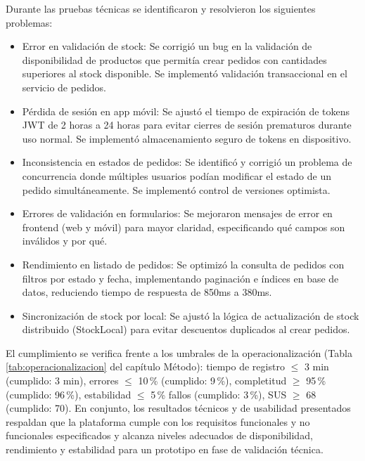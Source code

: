 Durante las pruebas técnicas se identificaron y resolvieron los siguientes problemas:
\begin{itemize}
  \item Error en validación de stock: Se corrigió un bug en la validación de disponibilidad de productos que permitía crear pedidos con cantidades superiores al stock disponible. Se implementó validación transaccional en el servicio de pedidos.
  \item Pérdida de sesión en app móvil: Se ajustó el tiempo de expiración de tokens JWT de 2 horas a 24 horas para evitar cierres de sesión prematuros durante uso normal. Se implementó almacenamiento seguro de tokens en dispositivo.
  \item Inconsistencia en estados de pedidos: Se identificó y corrigió un problema de concurrencia donde múltiples usuarios podían modificar el estado de un pedido simultáneamente. Se implementó control de versiones optimista.
  \item Errores de validación en formularios: Se mejoraron mensajes de error en frontend (web y móvil) para mayor claridad, especificando qué campos son inválidos y por qué.
  \item Rendimiento en listado de pedidos: Se optimizó la consulta de pedidos con filtros por estado y fecha, implementando paginación e índices en base de datos, reduciendo tiempo de respuesta de 850ms a 380ms.
  \item Sincronización de stock por local: Se ajustó la lógica de actualización de stock distribuido (StockLocal) para evitar descuentos duplicados al crear pedidos.
\end{itemize}

El cumplimiento se verifica frente a los umbrales de la operacionalización (Tabla \ref{tab:operacionalizacion} del capítulo Método): tiempo de registro $\leq$ 3 min (cumplido: 3 min), errores $\leq$ 10\,\% (cumplido: 9\,\%), completitud $\geq$ 95\,\% (cumplido: 96\,\%), estabilidad $\leq$ 5\,\% fallos (cumplido: 3\,\%), SUS $\geq$ 68 (cumplido: 70). En conjunto, los resultados técnicos y de usabilidad presentados respaldan que la plataforma cumple con los requisitos funcionales y no funcionales especificados y alcanza niveles adecuados de disponibilidad, rendimiento y estabilidad para un prototipo en fase de validación técnica.


